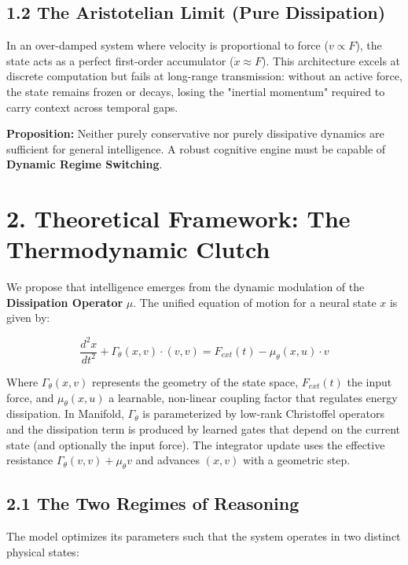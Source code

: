 \documentclass[12pt]{article}
\begin{document}
\subsection*{1.2 The Aristotelian Limit (Pure Dissipation)}

In an over-damped system where velocity is proportional to force ($v \propto F$), the state acts as a perfect first-order accumulator ($\dot{x} \approx F$). This architecture excels at discrete computation but fails at long-range transmission: without an active force, the state remains frozen or decays, losing the "inertial momentum" required to carry context across temporal gaps.

\textbf{Proposition:} Neither purely conservative nor purely dissipative dynamics are sufficient for general intelligence. A robust cognitive engine must be capable of \textbf{Dynamic Regime Switching}.

\section{2. Theoretical Framework: The Thermodynamic Clutch}

We propose that intelligence emerges from the dynamic modulation of the \textbf{Dissipation Operator} $\mu$. The unified equation of motion for a neural state $x$ is given by:

\begin{equation}
\frac{d^2 x}{dt^2} + \Gamma_\theta(x, v)\cdot (v, v) = F_{ext}(t) - \mu_\theta(x, u)\cdot v
\end{equation}

Where $\Gamma_\theta(x, v)$ represents the geometry of the state space, $F_{ext}(t)$ the input force, and $\mu_\theta(x, u)$ a learnable, non-linear coupling factor that regulates energy dissipation. In Manifold, $\Gamma_\theta$ is parameterized by low-rank Christoffel operators and the dissipation term is produced by learned gates that depend on the current state (and optionally the input force). The integrator update uses the effective resistance $\Gamma_\theta(v,v) + \mu_\theta v$ and advances $(x, v)$ with a geometric step.

\subsection*{2.1 The Two Regimes of Reasoning}

The model optimizes its parameters such that the system operates in two distinct physical states:
\end{document}
